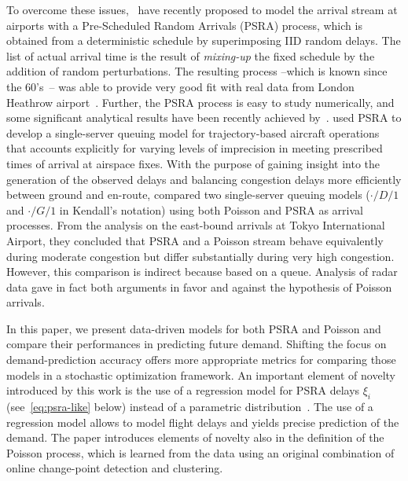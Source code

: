 \documentclass[]{elsarticle}
\begin{document}
To overcome these issues,~\citet{guadagni2011queueing} have recently proposed to model the arrival stream at airports with a Pre-Scheduled Random Arrivals (\ac{PSRA}) process, which is obtained from a deterministic schedule by superimposing \ac{IID} random delays.
The list of actual arrival time is the result of \emph{mixing-up} the fixed schedule by the addition of random perturbations.
The resulting process --which is known since the 60's~\citep{Kendall1964}-- was able to provide very good fit with real data from London Heathrow airport~\citep{caccavale2014model}.
Further, the \ac{PSRA} process is easy to study numerically, and some significant analytical results have been recently achieved by~\citet{lancia2013advances}.
\citet{nikoleris2012queueing} used \ac{PSRA} to develop a single-server queuing model for trajectory-based aircraft operations that accounts explicitly for varying levels of imprecision in meeting prescribed times of arrival at airspace fixes.
With the purpose of gaining insight into the generation of the observed delays and balancing congestion delays more efficiently between ground and en-route, \citet{gwiggner2014data} compared two single-server queuing models (\(\cdot/D/1\) and \(\cdot/G/1\) in Kendall's notation) using both Poisson and \ac{PSRA} as arrival processes.
From the analysis on the east-bound arrivals at Tokyo International Airport, they concluded that \ac{PSRA} and a Poisson stream behave equivalently during moderate congestion but differ substantially during very high congestion.
However, this comparison is indirect because based on a queue.
Analysis of radar data gave in fact both arguments in favor and against the hypothesis of Poisson arrivals.

In this paper, we present data-driven models for both \ac{PSRA} and Poisson  and compare their performances in predicting future demand.
Shifting the focus on demand-prediction accuracy offers more appropriate metrics for comparing those models in a stochastic optimization framework.
An important element of novelty introduced by this work is the use of a regression model for \ac{PSRA} delays \(\xi_i\) (see~\eqref{eq:psra-like} below) instead of a parametric  distribution~\citep{ball1,guadagni2011queueing,nikoleris2012queueing}.
The use of a regression model allows to model flight delays and yields precise prediction of the demand.
The paper introduces elements of novelty also in the definition of the Poisson process, which is learned from the data using an original combination of online change-point detection and clustering.
\end{document}
